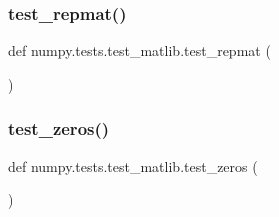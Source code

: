 \subsubsection{\texorpdfstring{test\+\_\+repmat()}{test\_repmat()}}
{\footnotesize\ttfamily def numpy.\+tests.\+test\+\_\+matlib.\+test\+\_\+repmat (\begin{DoxyParamCaption}{ }\end{DoxyParamCaption})}

\mbox{\label{namespacenumpy_1_1tests_1_1test__matlib_a0a5635dc75dd8cee207756dde501c58c}} 
\subsubsection{\texorpdfstring{test\+\_\+zeros()}{test\_zeros()}}
{\footnotesize\ttfamily def numpy.\+tests.\+test\+\_\+matlib.\+test\+\_\+zeros (\begin{DoxyParamCaption}{ }\end{DoxyParamCaption})}

